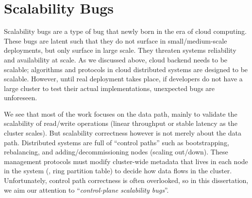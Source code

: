 \section{Scalability Bugs}

Scalability bugs are a type of bug that newly born in the era of cloud
computing. These bugs are latent such that they do not surface in
small/medium-scale deployments, but only surface in large scale. They threaten
systems reliability and availability at scale. As we discussed above, cloud
backend needs to be scalable; algorithms and protocols in cloud distributed
systems are designed to be scalable. However, until real deployment takes place,
if developers do not have a large cluster to test their actual implementations,
unexpected bugs are unforeseen. 

We see that most of the work \cite{Calotoiu+13-ApmScaleBug,
Laguna+15-DebugAtScale, Shudler+15-ExascaleLib, Wang+14-Exalt, Zhou+11-Vrisha,
Zhou+13-Wukong} focuses on the data path, mainly to validate the scalability of
read/write operations (linear throughput or stable latency as the cluster
scales). But scalability correctness however is not merely about the data path.
Distributed systems are full of ``control paths'' such as bootstrapping,
rebalancing, and adding/decommissioning nodes (scaling out/down). These
management protocols must modify cluster-wide metadata that lives in each node
in the system (\eg, ring partition table) to decide how data flows in the
cluster. Unfortunately, control path correctness is often overlooked, so in this
dissertation, we aim our attention to ``{\em control-plane scalability bugs}''.


